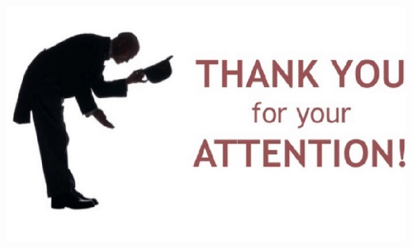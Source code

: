 \documentclass{beamer}
\begin{document}
\begin{frame}
\begin{center}
    \includegraphics[scale=0.5]{thank.jpg}
\end{center}
\end{frame}
\end{document}
